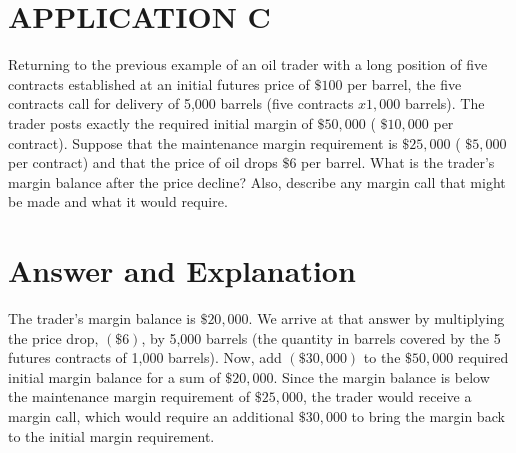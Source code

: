 \documentclass[11pt]{article}
\begin{document}
\section*{APPLICATION C}
Returning to the previous example of an oil trader with a long position of five contracts established at an initial futures price of $\$ 100$ per barrel, the five contracts call for delivery of 5,000 barrels (five contracts $x 1,000$ barrels). The trader posts exactly the required initial margin of $\$ 50,000$ ( $\$ 10,000$ per contract). Suppose that the maintenance margin requirement is $\$ 25,000$ ( $\$ 5,000$ per contract) and that the price of oil drops $\$ 6$ per barrel. What is the trader's margin balance after the price decline? Also, describe any margin call that might be made and what it would require.

\section*{Answer and Explanation}
The trader's margin balance is $\$ 20,000$. We arrive at that answer by multiplying the price drop, $(\$ 6)$, by 5,000 barrels (the quantity in barrels covered by the 5 futures contracts of 1,000 barrels). Now, add $(\$ 30,000)$ to the $\$ 50,000$ required initial margin balance for a sum of $\$ 20,000$. Since the margin balance is below the maintenance margin requirement of $\$ 25,000$, the trader would receive a margin call, which would require an additional $\$ 30,000$ to bring the margin back to the initial margin requirement.
\end{document}
